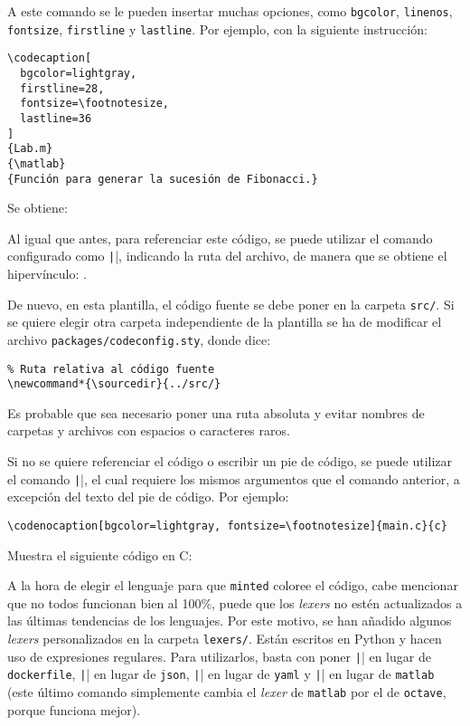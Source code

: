 \documentclass[../../main.tex]{subfile}
\begin{document}
  A este comando se le pueden insertar muchas opciones, como \texttt{bgcolor}, \texttt{linenos}, \texttt{fontsize}, \texttt{firstline} y \texttt{lastline}. Por ejemplo, con la siguiente instrucción:

  \begin{verbatim}
\codecaption[
  bgcolor=lightgray,
  firstline=28,
  fontsize=\footnotesize,
  lastline=36
]
{Lab.m}
{\matlab}
{Función para generar la sucesión de Fibonacci.}
  \end{verbatim}

  Se obtiene:


  Al igual que antes, para referenciar este código, se puede utilizar el comando configurado como \texttt||, indicando la ruta del archivo, de manera que se obtiene el hipervínculo: .

  De nuevo, en esta plantilla, el código fuente se debe poner en la carpeta \texttt{src/}. Si se quiere elegir otra carpeta independiente de la plantilla se ha de modificar el archivo \texttt{packages/codeconfig.sty}, donde dice:

  \begin{verbatim}
% Ruta relativa al código fuente
\newcommand*{\sourcedir}{../src/}
  \end{verbatim}

  Es probable que sea necesario poner una ruta absoluta y evitar nombres de carpetas y archivos con espacios o caracteres raros.

  Si no se quiere referenciar el código o escribir un pie de código, se puede utilizar el comando \texttt|\codenocaption|, el cual requiere los mismos argumentos que el comando anterior, a excepción del texto del pie de código. Por ejemplo:

  \begin{verbatim}
\codenocaption[bgcolor=lightgray, fontsize=\footnotesize]{main.c}{c}
  \end{verbatim}

  Muestra el siguiente código en C:


  A la hora de elegir el lenguaje para que \texttt{minted} coloree el código, cabe mencionar que no todos funcionan bien al 100\%, puede que los \textit{lexers} no estén actualizados a las últimas tendencias de los lenguajes. Por este motivo, se han añadido algunos \textit{lexers} personalizados en la carpeta \texttt{lexers/}. Están escritos en Python y hacen uso de expresiones regulares. Para utilizarlos, basta con poner \texttt|\dockerfile| en lugar de \texttt{dockerfile}, \texttt|\json| en lugar de \texttt{json}, \texttt|\yaml| en lugar de \texttt{yaml} y \texttt|\matlab| en lugar de \texttt{matlab} (este último comando simplemente cambia el \textit{lexer} de \texttt{matlab} por el de \texttt{octave}, porque funciona mejor).
\end{document}

